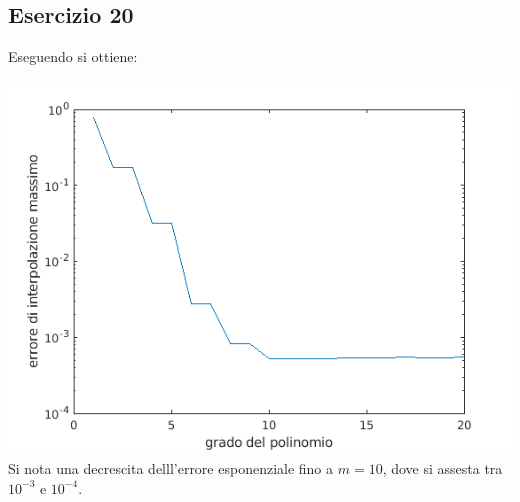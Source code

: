 \subsection{Esercizio 20}

Eseguendo  si ottiene:

\includegraphics[width = \linewidth]{capitolo4/squares.png}
Si nota una decrescita  delll'errore  esponenziale fino a  $m = 10$, dove si assesta tra $10^{-3}$ e $10^{-4}$.